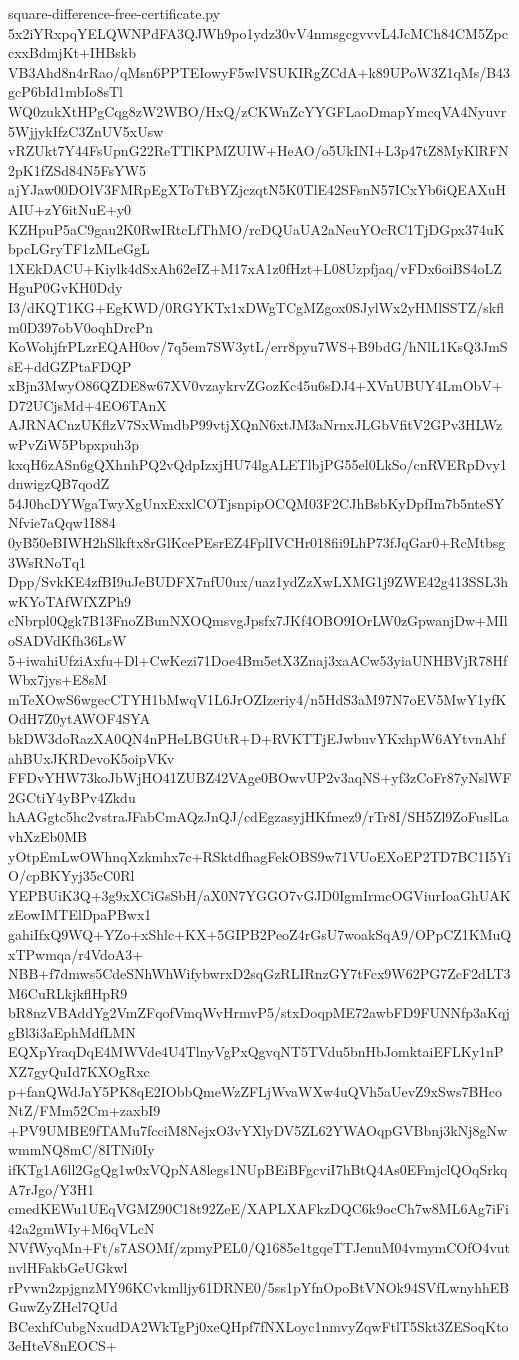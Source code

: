 \documentclass[11pt]{article}
\theoremstyle{definition}
\theoremstyle{remark}
\begin{document}
\begin{filecontents*}[overwrite]{square-difference-free-certificate.py}
5x2iYRxpqYELQWNPdFA3QJWh9po1ydz30vV4nmsgcgvvvL4JcMCh84CM5ZpccxxBdmjKt+IHBskb
VB3Ahd8n4rRao/qMsn6PPTEIowyF5wlVSUKIRgZCdA+k89UPoW3Z1qMs/B43gcP6bId1mbIo8sTl
WQ0zukXtHPgCqg8zW2WBO/HxQ/zCKWnZcYYGFLaoDmapYmcqVA4Nyuvr5WjjykIfzC3ZnUV5xUsw
vRZUkt7Y44FsUpnG22ReTTlKPMZUIW+HeAO/o5UkINI+L3p47tZ8MyKlRFN2pK1fZSd84N5FsYW5
ajYJaw00DOlV3FMRpEgXToTtBYZjczqtN5K0TlE42SFsnN57ICxYb6iQEAXuHAIU+zY6itNuE+y0
KZHpuP5aC9gau2K0RwIRtcLfThMO/rcDQUaUA2aNeuYOcRC1TjDGpx374uKbpcLGryTF1zMLeGgL
1XEkDACU+Kiylk4dSxAh62eIZ+M17xA1z0fHzt+L08Uzpfjaq/vFDx6oiBS4oLZHguP0GvKH0Ddy
I3/dKQT1KG+EgKWD/0RGYKTx1xDWgTCgMZgox0SJylWx2yHMlSSTZ/skflm0D397obV0oqhDrcPn
KoWohjfrPLzrEQAH0ov/7q5em7SW3ytL/err8pyu7WS+B9bdG/hNlL1KsQ3JmSsE+ddGZPtaFDQP
xBjn3MwyO86QZDE8w67XV0vzaykrvZGozKc45u6sDJ4+XVnUBUY4LmObV+D72UCjsMd+4EO6TAnX
AJRNACnzUKflzV7SxWmdbP99vtjXQnN6xtJM3aNrnxJLGbVfitV2GPv3HLWzwPvZiW5Pbpxpuh3p
kxqH6zASn6gQXhnhPQ2vQdpIzxjHU74lgALETlbjPG55el0LkSo/cnRVERpDvy1dnwigzQB7qodZ
54J0hcDYWgaTwyXgUnxExxlCOTjsnpipOCQM03F2CJhBsbKyDpfIm7b5nteSYNfvie7aQqw1I884
0yB50eBIWH2hSlkftx8rGlKcePEsrEZ4FplIVCHr018fii9LhP73fJqGar0+RcMtbsg3WsRNoTq1
Dpp/SvkKE4zfBI9uJeBUDFX7nfU0ux/uaz1ydZzXwLXMG1j9ZWE42g413SSL3hwKYoTAfWfXZPh9
cNbrpl0Qgk7B13FnoZBunNXOQmsvgJpsfx7JKf4OBO9IOrLW0zGpwanjDw+MIloSADVdKfh36LsW
5+iwahiUfziAxfu+Dl+CwKezi71Doe4Bm5etX3Znaj3xaACw53yiaUNHBVjR78HfWbx7jys+E8sM
mTeXOwS6wgecCTYH1bMwqV1L6JrOZIzeriy4/n5HdS3aM97N7oEV5MwY1yfKOdH7Z0ytAWOF4SYA
bkDW3doRazXA0QN4nPHeLBGUtR+D+RVKTTjEJwbuvYKxhpW6AYtvnAhfahBUxJKRDevoK5oipVKv
FFDvYHW73koJbWjHO41ZUBZ42VAge0BOwvUP2v3aqNS+yf3zCoFr87yNslWF2GCtiY4yBPv4Zkdu
hAAGgtc5hc2vstraJFabCmAQzJnQJ/cdEgzasyjHKfmez9/rTr8I/SH5Zl9ZoFuslLavhXzEb0MB
yOtpEmLwOWhnqXzkmhx7c+RSktdfhagFekOBS9w71VUoEXoEP2TD7BC1I5YiO/cpBKYyj35cC0Rl
YEPBUiK3Q+3g9xXCiGsSbH/aX0N7YGGO7vGJD0IgmIrmcOGViurIoaGhUAKzEowIMTElDpaPBwx1
gahiIfxQ9WQ+YZo+xShlc+KX+5GIPB2PeoZ4rGsU7woakSqA9/OPpCZ1KMuQxTPwmqa/r4VdoA3+
NBB+f7dmws5CdeSNhWhWifybwrxD2sqGzRLIRnzGY7tFcx9W62PG7ZcF2dLT3M6CuRLkjkflHpR9
bR8nzVBAddYg2VmZFqofVmqWvHrmvP5/stxDoqpME72awbFD9FUNNfp3aKqjgBl3i3aEphMdfLMN
EQXpYraqDqE4MWVde4U4TlnyVgPxQgvqNT5TVdu5bnHbJomktaiEFLKy1nPXZ7gyQuId7KXOgRxc
p+fanQWdJaY5PK8qE2IObbQmeWzZFLjWvaWXw4uQVh5aUevZ9xSws7BHcoNtZ/FMm52Cm+zaxbI9
+PV9UMBE9fTAMu7fcciM8NejxO3vYXlyDV5ZL62YWAOqpGVBbnj3kNj8gNwwmmNQ8mC/8ITNi0Iy
ifKTg1A6ll2GgQg1w0xVQpNA8legs1NUpBEiBFgcviI7hBtQ4As0EFmjclQOqSrkqA7rJgo/Y3H1
cmedKEWu1UEqVGMZ90C18t92ZeE/XAPLXAFkzDQC6k9ocCh7w8ML6Ag7iFi42a2gmWIy+M6qVLcN
NVfWyqMn+Ft/s7ASOMf/zpmyPEL0/Q1685e1tgqeTTJenuM04vmymCOfO4vutnvlHFakbGeUGkwl
rPvwn2zpjgnzMY96KCvkmlljy61DRNE0/5ss1pYfnOpoBtVNOk94SVfLwnyhhEBGuwZyZHcl7QUd
BCexhfCubgNxudDA2WkTgPj0xeQHpf7fNXLoyc1nmvyZqwFtlT5Skt3ZESoqKto3eHteV8nEOCS+

\end{filecontents*}
\end{document}
